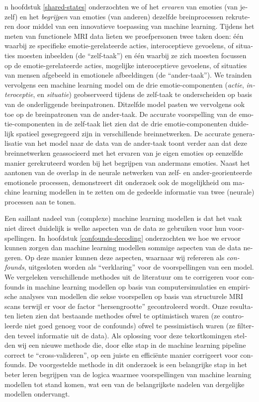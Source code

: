 \documentclass[12pt,american,a4paper,oneside,]{memoir} %
\newenvironment{dutch}[2][]{\begin{otherlanguage}{dutch}}{\end{otherlanguage}}
\begin{document}
\begin{dutch}
In hoofdstuk \ref{shared-states} onderzochten we of het \emph{ervaren} van emoties (van jezelf) en het \emph{begrijpen} van emoties (van anderen) dezelfde breinprocessen rekruteren door middel van een innovatieve toepassing van machine learning. Tijdens het meten van functionele MRI data lieten we proefpersonen twee taken doen: één waarbij ze specifieke emotie-gerelateerde acties, interoceptieve gevoelens, of situaties moesten inbeelden (de ``zelf-taak'') en één waarbij ze zich moesten focussen op de emotie-gerelateerde acties, mogelijke interoceptieve gevoelens, of situaties van mensen afgebeeld in emotionele afbeeldingen (de ``ander-taak''). We trainden vervolgens een machine learning model om de drie emotie-componenten (\emph{actie}, \emph{interoceptie}, en \emph{situatie}) geobserveerd tijdens de zelf-taak te onderscheiden op basis van de onderliggende breinpatronen. Ditzelfde model pasten we vervolgens ook toe op de breinpatronen van de ander-taak. De accurate voorspelling van de emotie-componenten in de zelf-taak liet zien dat de drie emotie-componenten duidelijk spatieel gesegregeerd zijn in verschillende breinnetwerken. De accurate generalisatie van het model naar de data van de ander-taak toont verder aan dat deze breinnetwerken geassocieerd met het ervaren van je eigen emoties op eenzelfde manier gerekruteerd worden bij het begrijpen van andermans emoties. Naast het aantonen van de overlap in de neurale netwerken van zelf- en ander-georienteerde emotionele processen, demonstreert dit onderzoek ook de mogelijkheid om machine learning modellen in te zetten om de gedeelde informatie van twee (neurale) processen aan te tonen.

Een saillant nadeel van (complexe) machine learning modellen is dat het vaak niet direct duidelijk is welke aspecten van de data ze gebruiken voor hun voorspellingen. In hoofdstuk \ref{confounds-decoding} onderzochten we hoe we ervoor kunnen zorgen dan machine learning modellen sommige aspecten van de data negeren. Op deze manier kunnen deze aspecten, waarnaar wij refereren als \emph{confounds}, uitgesloten worden als ``verklaring'' voor de voorspellingen van een model. We vergeleken verschillende methodes uit de literatuur om te corrigeren voor confounds in machine learning modellen op basis van computersimulaties en empirische analyses van modellen die sekse voorspellen op basis van structurele MRI scans terwijl er voor de factor ``hersengrootte'' gecontroleerd wordt. Onze resultaten lieten zien dat bestaande methodes ofwel te optimistisch waren (ze controleerde niet goed genoeg voor de confounds) ofwel te pessimistisch waren (ze filterden teveel informatie uit de data). Als oplossing voor deze tekortkomingen stelden wij een nieuwe methode die, door elke stap in de machine learning pipeline correct te ``cross-valideren'', op een juiste en efficiënte manier corrigeert voor confounds. De voorgestelde methode in dit onderzoek is een belangrijke stap in het beter leren begrijpen van de logica waarmee voorspellingen van machine learning modellen tot stand komen, wat een van de belangrijkste nadelen van dergelijke modellen ondervangt.


\end{dutch}
\end{document}

